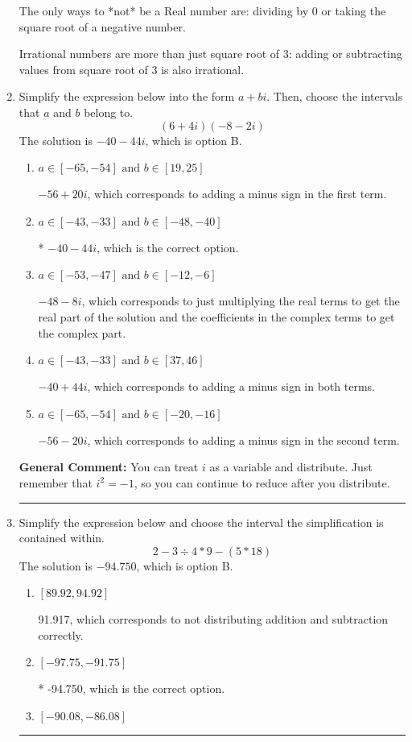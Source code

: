 \documentclass{extbook}[14pt]
\newcommand{\litem}[1]{\item #1

\rule{\textwidth}{0.4pt}}
\begin{document}
\begin{enumerate}
{ The only ways to *not* be a Real number are: dividing by 0 or taking the square root of a negative number. 
 
 Irrational numbers are more than just square root of 3: adding or subtracting values from square root of 3 is also irrational.
}
\litem{
Simplify the expression below into the form $a+bi$. Then, choose the intervals that $a$ and $b$ belong to.
\[ (6 + 4 i)(-8 - 2 i) \]
The solution is \( -40 - 44 i \), which is option B.\begin{enumerate}[label=\Alph*.]
\item \( a \in [-65, -54] \text{ and } b \in [19, 25] \)

 $-56 + 20 i$, which corresponds to adding a minus sign in the first term.
\item \( a \in [-43, -33] \text{ and } b \in [-48, -40] \)

* $-40 - 44 i$, which is the correct option.
\item \( a \in [-53, -47] \text{ and } b \in [-12, -6] \)

 $-48 - 8 i$, which corresponds to just multiplying the real terms to get the real part of the solution and the coefficients in the complex terms to get the complex part.
\item \( a \in [-43, -33] \text{ and } b \in [37, 46] \)

 $-40 + 44 i$, which corresponds to adding a minus sign in both terms.
\item \( a \in [-65, -54] \text{ and } b \in [-20, -16] \)

 $-56 - 20 i$, which corresponds to adding a minus sign in the second term.
\end{enumerate}

\textbf{General Comment:} You can treat $i$ as a variable and distribute. Just remember that $i^2=-1$, so you can continue to reduce after you distribute.
}
\litem{
Simplify the expression below and choose the interval the simplification is contained within.
\[ 2 - 3 \div 4 * 9 - (5 * 18) \]
The solution is \( -94.750 \), which is option B.\begin{enumerate}[label=\Alph*.]
\item \( [89.92, 94.92] \)

 91.917, which corresponds to not distributing addition and subtraction correctly.
\item \( [-97.75, -91.75] \)

* -94.750, which is the correct option.
\item \( [-90.08, -86.08] \)


\end{enumerate}}
\end{enumerate}
\end{document}
